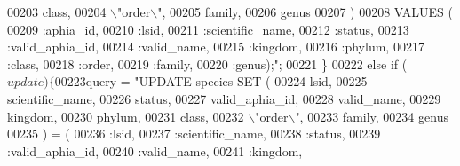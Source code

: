\begin{DoxyCode}
{00203 \textcolor{stringliteral}{                        class,}
00204 \textcolor{stringliteral}{                        \(\backslash\)"order\(\backslash\)",}
00205 \textcolor{stringliteral}{                        family,}
00206 \textcolor{stringliteral}{                        genus}
00207 \textcolor{stringliteral}{                        )}
00208 \textcolor{stringliteral}{                    VALUES (}
00209 \textcolor{stringliteral}{                        :aphia\_id,}
00210 \textcolor{stringliteral}{                        :lsid,}
00211 \textcolor{stringliteral}{                        :scientific\_name,}
00212 \textcolor{stringliteral}{                        :status,}
00213 \textcolor{stringliteral}{                        :valid\_aphia\_id,}
00214 \textcolor{stringliteral}{                        :valid\_name,}
00215 \textcolor{stringliteral}{                        :kingdom,}
00216 \textcolor{stringliteral}{                        :phylum,}
00217 \textcolor{stringliteral}{                        :class,}
00218 \textcolor{stringliteral}{                        :order,}
00219 \textcolor{stringliteral}{                        :family,}
00220 \textcolor{stringliteral}{                        :genus);"};
00221             \}
00222             \textcolor{keywordflow}{else} \textcolor{keywordflow}{if} ($update) \{
00223                 $query = \textcolor{stringliteral}{"UPDATE species SET (}
00224 \textcolor{stringliteral}{                        lsid,}
00225 \textcolor{stringliteral}{                        scientific\_name,}
00226 \textcolor{stringliteral}{                        status,}
00227 \textcolor{stringliteral}{                        valid\_aphia\_id,}
00228 \textcolor{stringliteral}{                        valid\_name,}
00229 \textcolor{stringliteral}{                        kingdom,}
00230 \textcolor{stringliteral}{                        phylum,}
00231 \textcolor{stringliteral}{                        class,}
00232 \textcolor{stringliteral}{                        \(\backslash\)"order\(\backslash\)",}
00233 \textcolor{stringliteral}{                        family,}
00234 \textcolor{stringliteral}{                        genus}
00235 \textcolor{stringliteral}{                    ) = (}
00236 \textcolor{stringliteral}{                        :lsid,}
00237 \textcolor{stringliteral}{                        :scientific\_name,}
00238 \textcolor{stringliteral}{                        :status,}
00239 \textcolor{stringliteral}{                        :valid\_aphia\_id,}
00240 \textcolor{stringliteral}{                        :valid\_name,}
00241 \textcolor{stringliteral}{                        :kingdom,}
}
\end{DoxyCode}

